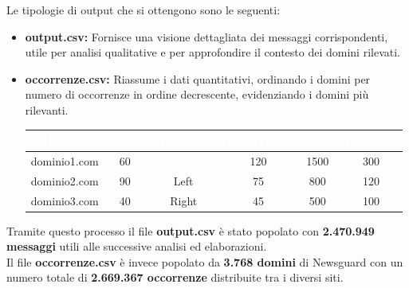 \documentclass[12pt]{article}
\begin{document}
	Le tipologie di output che si ottengono sono le seguenti:
	\begin{itemize}[label=]
		\item \textbf{output.csv:} Fornisce una visione dettagliata dei messaggi corrispondenti, utile per analisi qualitative e per approfondire il contesto dei domini rilevati.
		\item \textbf{occorrenze.csv:} Riassume i dati quantitativi, ordinando i domini per numero di occorrenze in ordine decrescente, evidenziando i domini più rilevanti.
		\begin{table}[h!]
			\centering
			\renewcommand{\arraystretch}{1.5}
			\setlength{\tabcolsep}{12pt}
			\begin{tabular}{|c|c|c|c|c|c|}
				\hline
				\rowcolor{darkblue!80} \textcolor{white}{\textbf{Domain}} & \textcolor{white}{\textbf{Score}} & \textcolor{white}{\textbf{Orientation}} & \textcolor{white}{\textbf{Occorrenze}} & \textcolor{white}{\textbf{Views}} & \textcolor{white}{\textbf{Forwards}} \\ \hline
				dominio1.com & 60 &  & 120 & 1500 & 300 \\ \hline
				dominio2.com & 90 & Left   & 75  & 800  & 120 \\ \hline
				dominio3.com & 40 & Right  & 45  & 500  & 100 \\ \hline
			\end{tabular}
		\end{table}
	\end{itemize}
	Tramite questo processo il file \textbf{output.csv} è stato popolato con \textbf{2.470.949 messaggi} utili alle successive analisi ed elaborazioni.\\
	Il file \textbf{occorrenze.csv} è invece popolato da \textbf{3.768 domini} di Newsguard con un numero totale di \textbf{2.669.367 occorrenze} distribuite tra i diversi siti.
\end{document}
